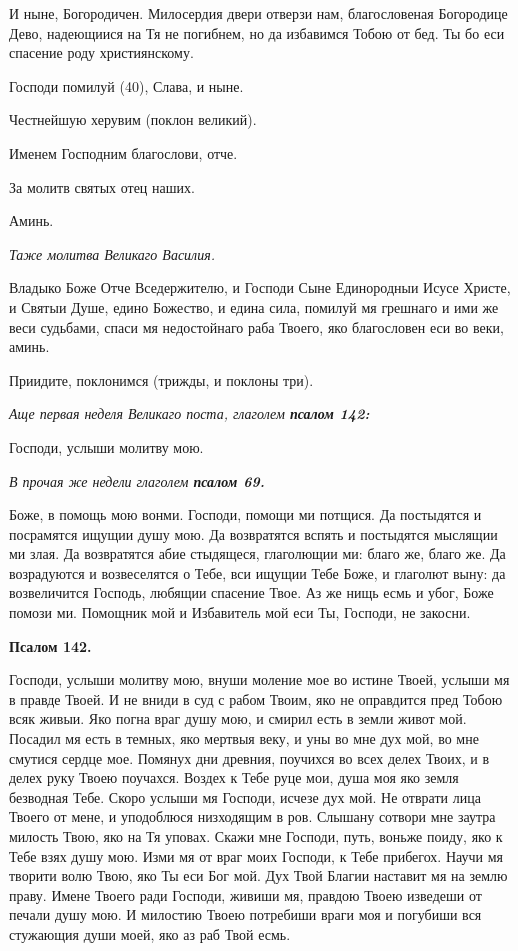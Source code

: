 И ныне, Богородичен. Милосердия двери отверзи нам, благословеная Богородице Дево, надеющиися на Тя не погибнем, но да избавимся Тобою от бед. Ты бо еси спасение роду християнскому.

Господи помилуй (40), Слава, и ныне.

Честнейшую херувим (поклон великий).

Именем Господним благослови, отче.

За молитв святых отец наших.

Аминь.


\itshape Таже молитва Великаго Василия.\normalfont{}


Владыко Боже Отче Вседержителю, и Господи Сыне Единородныи Исусе Христе, и Святыи Душе, едино Божество, и едина сила, помилуй мя грешнаго и ими же веси судьбами, спаси мя недостойнаго раба Твоего, яко благословен еси во веки, аминь.

Приидите, поклонимся (трижды, и поклоны три).


\itshape Аще первая неделя Великаго поста, глаголем \bfseries псалом 142:\normalfont{}\normalfont{}


Господи, услыши молитву мою.


\itshape В прочая же недели глаголем \bfseries псалом 69\normalfont{}.\normalfont{}


Боже, в помощь мою вонми. Господи, помощи ми потщися. Да постыдятся и посрамятся ищущии душу мою. Да возвратятся вспять и постыдятся мыслящии ми злая. Да возвратятся абие стыдящеся, глаголющии ми: благо же, благо же. Да возрадуются и возвеселятся о Тебе, вси ищущии Тебе Боже, и глаголют выну: да возвеличится Господь, любящии спасение Твое. Аз же нищь есмь и убог, Боже помози ми. Помощник мой и Избавитель мой еси Ты, Господи, не закосни.


\medskip


\bfseries Псалом 142.\normalfont{}


Господи, услыши молитву мою, внуши моление мое во истине Твоей, услыши мя в правде Твоей. И не вниди в суд с рабом Твоим, яко не оправдится пред Тобою всяк живыи. Яко погна враг душу мою, и смирил есть в земли живот мой. Посадил мя есть в темных, яко мертвыя веку, и уны во мне дух мой, во мне смутися сердце мое. Помянух дни древния, поучихся во всех делех Твоих, и в делех руку Твоею поучахся. Воздех к Тебе руце мои, душа моя яко земля безводная Тебе. Скоро услыши мя Господи, исчезе дух мой. Не отврати лица Твоего от мене, и уподоблюся низходящим в ров. Слышану сотвори мне заутра милость Твою, яко на Тя уповах. Скажи мне Господи, путь, воньже поиду, яко к Тебе взях душу мою. Изми мя от враг моих Господи, к Тебе прибегох. Научи мя творити волю Твою, яко Ты еси Бог мой. Дух Твой Благии наставит мя на землю праву. Имене Твоего ради Господи, живиши мя, правдою Твоею изведеши от печали душу мою. И милостию Твоею потребиши враги моя и погубиши вся стужающия души моей, яко аз раб Твой есмь.

